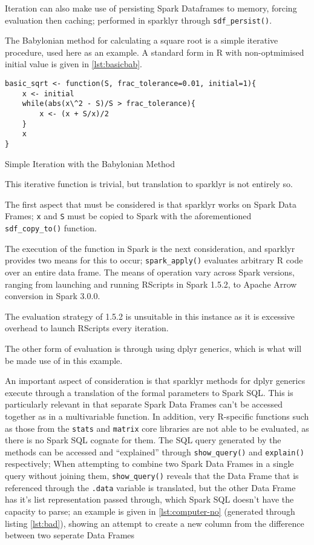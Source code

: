 Iteration can also make use of persisting Spark Dataframes to memory,
forcing evaluation then caching; performed in sparklyr through
\texttt{sdf_persist()}.

The Babylonian method for calculating a square root is a simple
iterative procedure, used here as an example. A standard form in R with
non-optmimised initial value is given in \ref{lst:basicbab}.

\begin{listing}
	\begin{verbatim}
basic_sqrt <- function(S, frac_tolerance=0.01, initial=1){
	x <- initial
	while(abs(x\^2 - S)/S > frac_tolerance){
		x <- (x + S/x)/2
	}
	x
}
\end{verbatim}
	\caption{Simple Iteration with the Babylonian Method}
	\label{lst:basicbab}
\end{listing}


This iterative function is trivial, but translation to sparklyr is not
entirely so.

The first aspect that must be considered is that sparklyr works on Spark
Data Frames; \texttt{x} and \texttt{S} must be copied to Spark with the
aforementioned \texttt{sdf_copy_to()}
function.

The execution of the function in Spark is the next consideration, and
sparklyr provides two means for this to occur;
\texttt{spark_apply()} evaluates arbitrary R
code over an entire data frame. The means of operation vary across Spark
versions, ranging from launching and running RScripts in Spark 1.5.2, to
Apache Arrow conversion in Spark 3.0.0.

The evaluation strategy of 1.5.2 is unsuitable in this instance as it is
excessive overhead to launch RScripts every iteration.

The other form of evaluation is through using dplyr generics, which is
what will be made use of in this example.

An important aspect of consideration is that sparklyr methods for dplyr
generics execute through a translation of the formal parameters to Spark
SQL. This is particularly relevant in that separate Spark Data Frames
can't be accessed together as in a multivariable function. In addition,
very R-specific functions such as those from the \texttt{stats} and
\texttt{matrix} core libraries are not able to be evaluated, as there is
no Spark SQL cognate for them. The SQL query generated by the methods
can be accessed and ``explained'' through
\texttt{show_query()} and
\texttt{explain()} respectively; When attempting
to combine two Spark Data Frames in a single query without joining them,
\texttt{show_query()} reveals that the Data
Frame that is referenced through the \texttt{.data} variable is
translated, but the other Data Frame has it's list representation passed
through, which Spark SQL doesn't have the capacity to parse; an example
is given in \ref{lst:computer-no} (generated through listing
\ref{lst:bad}), showing an attempt to create a new column from the
difference between two seperate Data Frames

